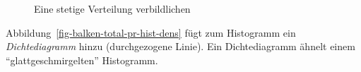 \documentclass[
  letterpaper,
  twoside,
  open=any]{scrbook}
\theoremstyle{definition}
\theoremstyle{definition}
\theoremstyle{definition}
\theoremstyle{remark}
\begin{document}
\begin{figure}

\begin{minipage}{0.50\linewidth}



\end{minipage}%
%
\begin{minipage}{0.50\linewidth}



\end{minipage}%

\caption{\label{fig-de-hist-density}Eine stetige Verteilung
verbildlichen}

\end{figure}%

Abbildung~\ref{fig-balken-total-pr-hist-dens} fügt zum Histogramm ein
\emph{Dichtediagramm} hinzu (durchgezogene Linie). Ein Dichtediagramm
ähnelt einem \enquote{glattgeschmirgelten} Histogramm.
\end{document}
